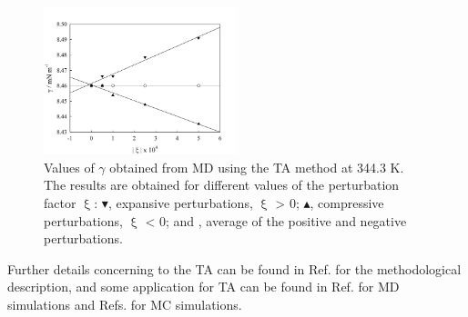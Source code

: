 \documentclass[9pt,bestpractices]{livecoms}
\begin{document}
\begin{figure}
\includegraphics[width=0.5\textwidth]{gfx/image66.jpeg}
\caption{Values of {${\gamma}$} obtained from MD using the TA method at 344.3 K. The results are obtained for different values of the perturbation factor ${\upxi}$: $\blacktriangledown$, expansive perturbations, ${\upxi}$ {\textgreater} 0; $\blacktriangle$, compressive perturbations, ${\upxi}$ {\textless} 0; and \textbigcircle, average of the positive and negative perturbations.}
\label{fig:20}
\end{figure}

Further details concerning to the TA can be found in Ref.
\citep{gloor2005} for the methodological description, and some
application for TA can be found in Ref. \citep{muller2009}
for MD simulations and Refs. \citep{ghoufi2016,sampayo2010} for MC simulations.
\end{document}

